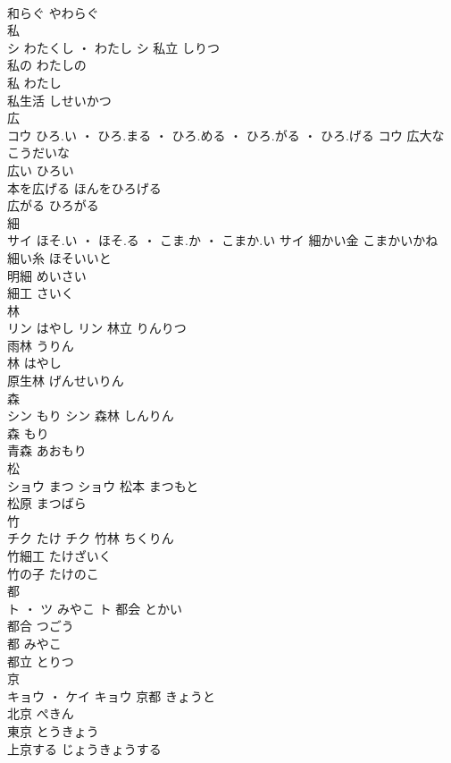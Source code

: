 \documentclass[8pt]{extreport}
\begin{document}
\begin{CJK}{UTF8}{min}
\\	和らぐ	やわらぐ	
\\	私	
\\	シ	わたくし ・ わたし	シ	私立	しりつ	
\\	私の	わたしの	
\\	私	わたし	
\\	私生活	しせいかつ	
\\	広	
\\	コウ	ひろ.い ・ ひろ.まる ・ ひろ.める ・ ひろ.がる ・ ひろ.げる	コウ	広大な	こうだいな	
\\	広い	ひろい	
\\	本を広げる	ほんをひろげる	
\\	広がる	ひろがる	
\\	細	
\\	サイ	ほそ.い ・ ほそ.る ・ こま.か ・ こまか.い	サイ	細かい金	こまかいかね	
\\	細い糸	ほそいいと	
\\	明細	めいさい	
\\	細工	さいく	
\\	林	
\\	リン	はやし	リン													林立	りんりつ	
\\	雨林	うりん	
\\	林	はやし	
\\	原生林	げんせいりん	
\\	森	
\\	シン	もり	シン	森林	しんりん	
\\	森	もり	
\\	青森	あおもり	
\\	松	
\\	ショウ	まつ	ショウ													松本	まつもと	
\\	松原	まつばら	
\\	竹	
\\	チク	たけ	チク	竹林	ちくりん	
\\	竹細工	たけざいく	
\\	竹の子	たけのこ	
\\	都	
\\	ト ・ ツ	みやこ	ト	都会	とかい	
\\	都合	つごう	
\\	都	みやこ	
\\	都立	とりつ	
\\	京	
\\	キョウ ・ ケイ		キョウ													京都	きょうと	
\\	北京	ぺきん	
\\	東京	とうきょう	
\\	上京する	じょうきょうする	

\end{CJK}
\end{document}
